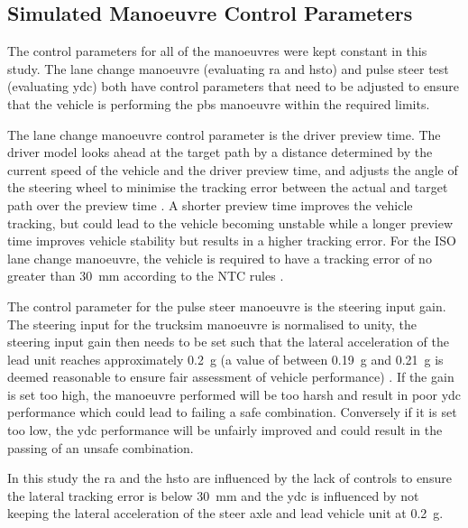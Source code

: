 \subsection{Simulated Manoeuvre Control Parameters}\label{section:discussion-limitations-control-parameters}

The control parameters for all of the manoeuvres were kept constant in this study. The lane change manoeuvre (evaluating \gls{ra} and \gls{hsto}) and pulse steer test (evaluating \gls{ydc}) both have control parameters that need to be adjusted to ensure that the vehicle is performing the \gls{pbs} manoeuvre within the required limits.

The lane change manoeuvre control parameter is the driver preview time. The driver model looks ahead at the target path by a distance determined by the current speed of the vehicle and the driver preview time, and adjusts the angle of the steering wheel to minimise the tracking error between the actual and target path over the preview time \cite{MechanicalSimulationHelpFileDriverControls2017}. A shorter preview time improves the vehicle tracking, but could lead to the vehicle becoming unstable while a longer preview time improves vehicle stability but results in a higher tracking error. For the ISO lane change manoeuvre, the vehicle is required to have a tracking error of no greater than 30~mm according to the NTC rules \cite{NationalTransportCommission2008}.

The control parameter for the pulse steer manoeuvre is the steering input gain. The steering input for the \gls{trucksim} manoeuvre is normalised to unity, the steering input gain then needs to be set such that the lateral acceleration of the lead unit reaches approximately 0.2~g (a value of between 0.19~g and 0.21~g is deemed reasonable to ensure fair assessment of vehicle performance) \cite{MechanicalSimulationTechMemoPBS2017}. If the gain is set too high, the manoeuvre performed will be too harsh and result in poor \gls{ydc} performance which could lead to failing a safe combination. Conversely if it is set too low, the \gls{ydc} performance will be unfairly improved and could result in the passing of an unsafe combination.

In this study the \gls{ra} and the \gls{hsto} are influenced by the lack of controls to ensure the lateral tracking error is below 30~mm and the \gls{ydc} is influenced by not keeping the lateral acceleration of the steer axle and lead vehicle unit at 0.2~g.

